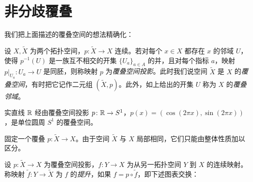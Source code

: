 
\section{非分歧覆叠}

我们把上面描述的覆叠空间的想法精确化：

\begin{definition}[2.1]
设 $X,\tilde X$ 为两个拓扑空间，$p\colon\tilde X\to X$ 连续。若对每个 $x\in X$ 都存在 $x$ 的邻域 $U$，使得 $p^{-1}(U)$ 是一族互不相交的开集 $\{U_a\}_{a\in A}$ 的并，且对每个指标 $a$，映射 $p|_{U_a}\colon U_a\to U$ 是同胚，则称映射 $p$ 为\emph{覆叠空间投影}。此时我们说空间 $\tilde X$ 是 $X$ 的\emph{覆叠空间}，有时把它记作二元组 $(\tilde X,p)$。此外，如上给出的开集 $U$ 称为 $X$ 的\emph{覆叠邻域}。
\end{definition}

\begin{example}[2.2]
实直线 $\mathbb{R}$ 经由覆叠空间投影 $p\colon\mathbb{R}\to S^1$，$p(x)=(\cos(2\pi x),\sin(2\pi x))$，是单位圆周 $S^1$ 的覆叠空间。
\end{example}

固定一个覆叠 $p\colon\tilde X\to X$。由于空间 $\tilde X$ 与 $X$ 局部相同，它们只能由整体性质加以区分。

\begin{definition}[2.3]
设 $p\colon\tilde X\to X$ 为覆叠空间投影，$f\colon Y\to X$ 为从另一拓扑空间 $Y$ 到 $X$ 的连续映射。称映射 $\tilde f\colon Y\to\tilde X$ 为 $f$ 的\emph{提升}，如果 $f=p\circ\tilde f$，即下述图表交换：
\begin{center}
\end{center}
\end{definition}

